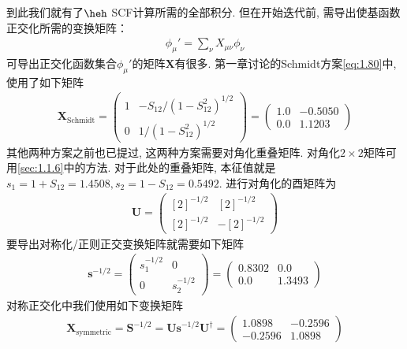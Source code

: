 到此我们就有了$\heh$ SCF计算所需的全部积分. 
但在开始迭代前, 
需导出使基函数正交化所需的变换矩阵：
\begin{align}
	\phi_\mu'=\sum_\nu X_{\mu\nu}\phi_\nu
\end{align}
可导出正交化函数集合$\phi_\mu'$的矩阵$\mathbf{X}$有很多. 
第一章讨论的Schmidt方案\autoref{eq:1.80}中, 
使用了如下矩阵
\begin{align}
	\mathbf{X}_\mathrm{Schmidt} = 
	\begin{pmatrix}
		1 & -S_{12}/(1-S_{12}^2)^{1/2} \\
		0 & 1/(1-S_{12}^2)^{1/2}
	\end{pmatrix}=
	\begin{pmatrix}
		1.0 & -0.5050 \\
		0.0 & 1.1203
	\end{pmatrix}
\end{align}
其他两种方案之前也已提过, 
这两种方案需要对角化重叠矩阵. 
对角化$2\times2$矩阵可用\autoref{sec:1.1.6}中的方法. 
对于此处的重叠矩阵, 
本征值就是$s_1=1+S_{12}=1.4508,s_2=1-S_{12}=0.5492$. 
进行对角化的酉矩阵为
\begin{align}
	\mathbf{U}=
	\begin{pmatrix}
		[2]^{-1/2}&[2]^{-1/2}\\
		[2]^{-1/2}&-[2]^{-1/2}
	\end{pmatrix}
\end{align}
要导出对称化/正则正交变换矩阵就需要如下矩阵
\begin{align}
	\mathbf{s}^{-1/2}=
	\begin{pmatrix}
		s_1^{-1/2}&0\\0&s_2^{-1/2}
	\end{pmatrix}=
	\begin{pmatrix}
		0.8302&0.0\\0.0&1.3493
	\end{pmatrix}
\end{align}
对称正交化中我们使用如下变换矩阵
\begin{align}
	\mathbf{X}_\mathrm{symmetric} = \mathbf{S}^{-1/2}=\mathbf{Us}^{-1/2}\mathbf{U^\dagger}=
	\begin{pmatrix}
		1.0898&-0.2596\\-0.2596&1.0898
	\end{pmatrix}
\end{align}
